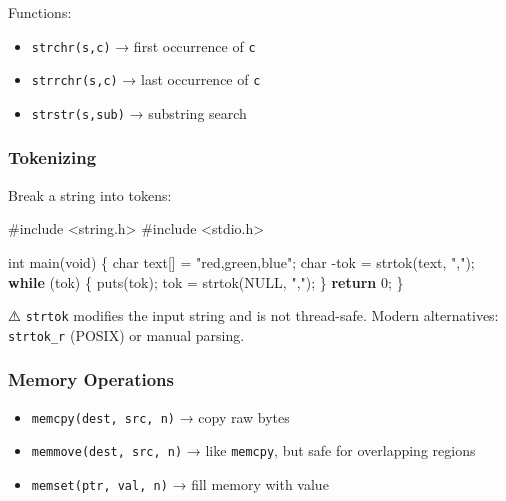\documentclass[
  letterpaper,
  DIV=11,
  numbers=noendperiod]{scrreprt}
\newenvironment{Shaded}{\begin{snugshade}}{\end{snugshade}}
\newcommand{\ControlFlowTok}[1]{\textcolor[rgb]{0.00,0.23,0.31}{\textbf{#1}}}
\newcommand{\DataTypeTok}[1]{\textcolor[rgb]{0.68,0.00,0.00}{#1}}
\newcommand{\DecValTok}[1]{\textcolor[rgb]{0.68,0.00,0.00}{#1}}
\newcommand{\ImportTok}[1]{\textcolor[rgb]{0.00,0.46,0.62}{#1}}
\newcommand{\NormalTok}[1]{\textcolor[rgb]{0.00,0.23,0.31}{#1}}
\newcommand{\OperatorTok}[1]{\textcolor[rgb]{0.37,0.37,0.37}{#1}}
\newcommand{\PreprocessorTok}[1]{\textcolor[rgb]{0.68,0.00,0.00}{#1}}
\newcommand{\StringTok}[1]{\textcolor[rgb]{0.13,0.47,0.30}{#1}}
\providecommand{\tightlist}{%
  \setlength{\itemsep}{0pt}\setlength{\parskip}{0pt}}
\begin{document}
Functions:

\begin{itemize}
\tightlist
\item
  \texttt{strchr(s,c)} → first occurrence of \texttt{c}
\item
  \texttt{strrchr(s,c)} → last occurrence of \texttt{c}
\item
  \texttt{strstr(s,sub)} → substring search
\end{itemize}

\subsubsection{Tokenizing}\label{tokenizing}

Break a string into tokens:

\begin{Shaded}
\begin{Highlighting}[]
\PreprocessorTok{\#include }\ImportTok{\textless{}string.h\textgreater{}}
\PreprocessorTok{\#include }\ImportTok{\textless{}stdio.h\textgreater{}}

\DataTypeTok{int}\NormalTok{ main}\OperatorTok{(}\DataTypeTok{void}\OperatorTok{)} \OperatorTok{\{}
    \DataTypeTok{char}\NormalTok{ text}\OperatorTok{[]} \OperatorTok{=} \StringTok{"red,green,blue"}\OperatorTok{;}
    \DataTypeTok{char} \OperatorTok{{-}}\NormalTok{tok }\OperatorTok{=}\NormalTok{ strtok}\OperatorTok{(}\NormalTok{text}\OperatorTok{,} \StringTok{","}\OperatorTok{);}
    \ControlFlowTok{while} \OperatorTok{(}\NormalTok{tok}\OperatorTok{)} \OperatorTok{\{}
\NormalTok{        puts}\OperatorTok{(}\NormalTok{tok}\OperatorTok{);}
\NormalTok{        tok }\OperatorTok{=}\NormalTok{ strtok}\OperatorTok{(}\NormalTok{NULL}\OperatorTok{,} \StringTok{","}\OperatorTok{);}
    \OperatorTok{\}}
    \ControlFlowTok{return} \DecValTok{0}\OperatorTok{;}
\OperatorTok{\}}
\end{Highlighting}
\end{Shaded}

⚠️ \texttt{strtok} modifies the input string and is not thread-safe.
Modern alternatives: \texttt{strtok\_r} (POSIX) or manual parsing.

\subsubsection{Memory Operations}\label{memory-operations}

\begin{itemize}
\tightlist
\item
  \texttt{memcpy(dest,\ src,\ n)} → copy raw bytes
\item
  \texttt{memmove(dest,\ src,\ n)} → like \texttt{memcpy}, but safe for
  overlapping regions
\item
  \texttt{memset(ptr,\ val,\ n)} → fill memory with value
\end{itemize}
\end{document}
